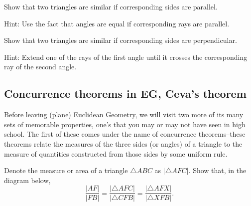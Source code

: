 \begin{question}
\label{39} Show that two triangles are similar if corresponding
sides are parallel.

Hint: Use the fact that angles are equal if corresponding rays are
parallel.
\end{question}

\begin{question}
Show that two triangles are similar if corresponding sides are perpendicular.

Hint: Extend one of the rays of the first angle until it crosses the
corresponding ray of the second angle.
\end{question}

\pagebreak

\subsection*{Concurrence theorems in \textbf{EG}, Ceva's theorem}

Before leaving (plane) Euclidean Geometry, we will visit two more of
its many sets of memorable properties, one's that you may or may not
have seen in high school. The first of these comes under the name of
concurrence theorems--these theorems relate the measures of the three
sides (or angles) of a triangle to the measure of quantities
constructed from those sides by some uniform rule.

\begin{question}
\label{25} Denote the measure or area of a triangle $\triangle
ABC$ as $\left\vert \triangle AFC\right\vert $. Show that, in the
diagram below,
\[
\frac{\left\vert AF\right\vert }{\left\vert FB\right\vert }=\frac{\left\vert
\triangle AFC\right\vert }{\left\vert \triangle CFB\right\vert }%
=\frac{\left\vert \triangle AFX\right\vert }{\left\vert \triangle
XFB\right\vert }.
\]
\begin{image}
\end{image}
\end{question}

